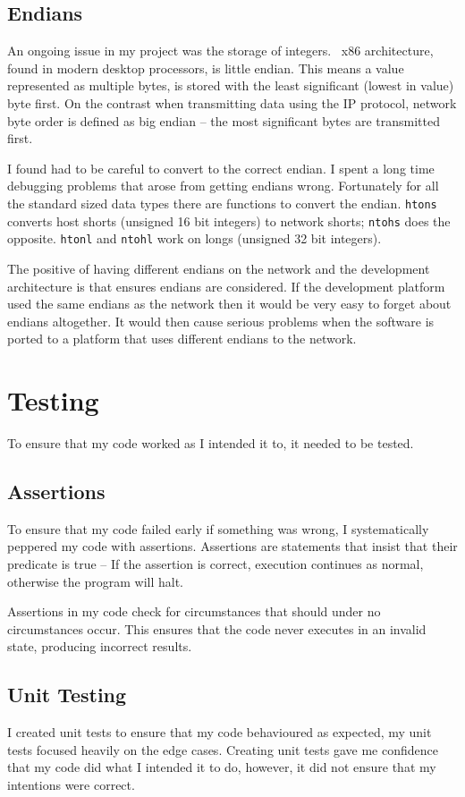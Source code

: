 \documentclass[12pt]{report}
\begin{document}
\section{Endians}
An ongoing issue in my project was the storage of integers.
\ x86 architecture, found in modern desktop processors, is little endian.
This means a value represented as multiple bytes, is stored with the least
significant (lowest in value) byte first. On the contrast
when transmitting data using the IP protocol, network byte order
is defined as big endian -- the most significant bytes are transmitted
first. 

I found had to be careful to convert to the correct endian. I spent a long time
debugging problems that arose from getting endians wrong. Fortunately for all
the standard sized data types there are functions to convert the endian.
\texttt{htons} converts host shorts (unsigned 16 bit integers) to network
shorts; \texttt{ntohs} does the opposite.  \texttt{htonl} and \texttt{ntohl}
work on longs (unsigned 32 bit integers). 

The positive of having different endians on the network and the development
architecture is that ensures endians are considered. If the development platform
used the same endians as the network then it would be very easy to forget about
endians altogether. It would then cause serious problems when the software is
ported to a platform that uses different endians to the network.
    
\chapter{Testing}
To ensure that my code worked as I intended it to, it needed to be
tested. 

\section{Assertions}
To ensure that my code failed early if something was wrong, I systematically
peppered my code with assertions. Assertions are statements that insist that
their predicate is true -- If the assertion is correct, execution continues as
normal, otherwise the program will halt.

Assertions in my code check for circumstances that should under no
circumstances occur. This ensures that the code never executes in an invalid
state, producing incorrect results. 

\section{Unit Testing}
I created unit tests to ensure that my code behavioured as expected, my unit
tests focused heavily on the edge cases. Creating unit tests gave me confidence
that my code did what I intended it to do, however, it did not ensure that my
intentions were correct.
\end{document}
